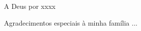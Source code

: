 \begin{agradecimentos}
A Deus por xxxx

Agradecimentos especiais à minha família ...
\end{agradecimentos}
